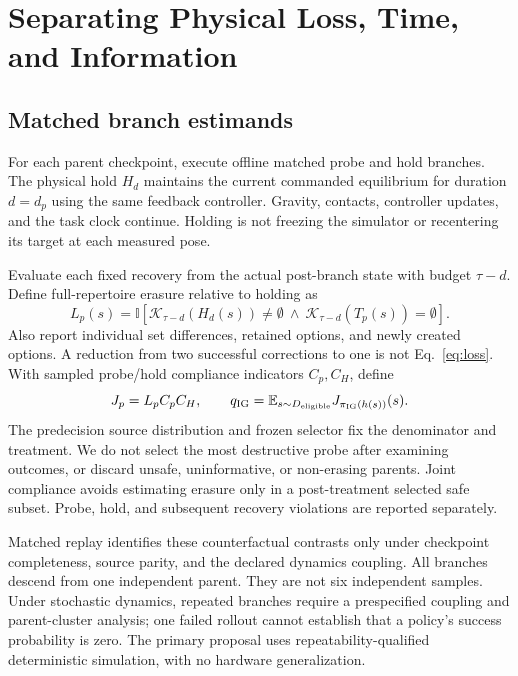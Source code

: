 \documentclass[conference]{IEEEtran}
\newcommand{\K}{\mathcal K}
\newcommand{\E}{\mathbb E}
\newcommand{\ind}{\mathbb I}
\begin{document}
\section{Separating Physical Loss, Time, and Information}
\subsection{Matched branch estimands}
For each parent checkpoint, execute offline matched probe and hold branches. The physical hold $H_d$ maintains the current commanded equilibrium for duration $d=d_p$ using the same feedback controller. Gravity, contacts, controller updates, and the task clock continue. Holding is not freezing the simulator or recentering its target at each measured pose.

Evaluate each fixed recovery from the actual post-branch state with budget $\tau-d$. Define full-repertoire erasure relative to holding as
\begin{equation}
L_p(s)=\ind\!\left[\K_{\tau-d}(H_d(s))\ne\emptyset\ \land\ \K_{\tau-d}(T_p(s))=\emptyset\right].\label{eq:loss}
\end{equation}
Also report individual set differences, retained options, and newly created options. A reduction from two successful corrections to one is not Eq.~\eqref{eq:loss}. With sampled probe/hold compliance indicators $C_p,C_H$, define
\begin{equation}
J_p=L_pC_pC_H,\qquad
q_{\rm IG}=\E_{s\sim D_{\rm eligible}}J_{\pi_{\rm IG}(h(s))}(s).\label{eq:joint}
\end{equation}
The predecision source distribution and frozen selector fix the denominator and treatment. We do not select the most destructive probe after examining outcomes, or discard unsafe, uninformative, or non-erasing parents. Joint compliance avoids estimating erasure only in a post-treatment selected safe subset. Probe, hold, and subsequent recovery violations are reported separately.

Matched replay identifies these counterfactual contrasts only under checkpoint completeness, source parity, and the declared dynamics coupling. All branches descend from one independent parent. They are not six independent samples. Under stochastic dynamics, repeated branches require a prespecified coupling and parent-cluster analysis; one failed rollout cannot establish that a policy's success probability is zero. The primary proposal uses repeatability-qualified deterministic simulation, with no hardware generalization.
\end{document}
